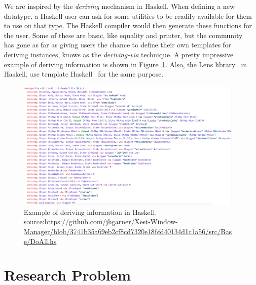 We are inspired by the \emph{deriving} mechanism in Haskell. When defining a new datatype, a Haskell user can ask for some utilities to be readily available for them to use on that type. The Haskell compiler would then generate these functions for the user. Some of these are basic, like equality and printer, but the community has gone as far as giving users the chance to define their own templates for deriving instances, knows as the \emph{deriving-via} technique. A pretty impressive example of deriving information is shown in Figure~\ref{fig:deriving-via-example}. 
Also, the Lens library~\cite{lensesLib} in Haskell, use template Haskell~\cite{sheard2002TH} for the same purpose. 
\begin{figure}
 \includegraphics[scale=0.5,width=\linewidth]{figures/deriving-via-example.png}
 \caption{Example of deriving information in Haskell. source:\url{https://github.com/jhgarner/Xest-Window-Manager/blob/3741b35a69eb2cf8cd7320e186fd40134d1c1a56/src/Base/DoAll.hs}}
 \label{fig:deriving-via-example}
\end{figure}


\section{Research Problem}

